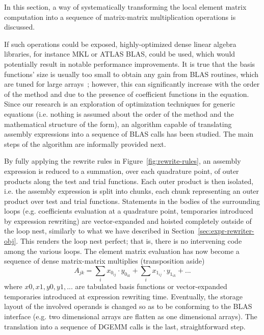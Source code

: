 In this section, a way of systematically transforming the local element matrix computation into a sequence of matrix-matrix multiplication operations is discussed. 

If such operations could be exposed, highly-optimized dense linear algebra libraries, for instance MKL or ATLAS BLAS, could be used, which would potentially result in notable performance improvements. It is true that the basis functions' size is usually too small to obtain any gain from BLAS routines, which are tuned for large arrays~\citep{nek5000}; however, this can significantly increase with the order of the method and due to the presence of coefficient functions in the equation. Since our research is an exploration of optimization techniques for generic equations (i.e. nothing is assumed about the order of the method and the mathematical structure of the form), an algorithm capable of translating assembly expressions into a sequence of BLAS calls has been studied. The main steps of the algorithm are informally provided next. 

By fully applying the rewrite rules in Figure~\ref{fig:rewrite-rules}, an assembly expression is reduced to a summation, over each quadrature point, of outer products along the test and trial functions. Each outer product is then isolated, i.e. the assembly expression is split into chunks, each chunk representing an outer product over test and trial functions. Statements in the bodies of the surrounding loops (e.g. coefficients evaluation at a quadrature point, temporaries introduced by expression rewriting) are vector-expanded and hoisted completely outside of the loop nest, similarly to what we have described in Section~\ref{sec:expr-rewriter-obj}. This renders the loop nest perfect; that is, there is no intervening code among the various loops. The element matrix evaluation has now become a sequence of dense matrix-matrix multiplies (transposition aside)
\begin{equation*}
A_{jk} = \sum_{i} x_{0_{ij}} \cdot y_{0_{ik}} + \sum_{i} x_{1_{ij}} \cdot y_{1_{ik}} + ...
\end{equation*}
where $x0, x1, y0, y1, ...$ are tabulated basis functions or vector-expanded temporaries introduced at expression rewriting time. Eventually, the storage layout of the involved operands is changed so as to be conforming to the BLAS interface (e.g. two dimensional arrays are flatten as one dimensional arrays). The translation into a sequence of DGEMM calls is the last, straightforward step. 

